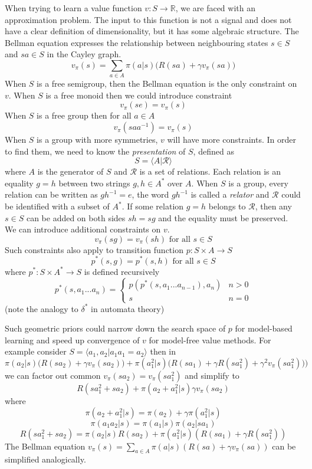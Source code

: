\documentclass[12pt]{article}
\begin{document}
When trying to learn a value function $v:S\rightarrow \mathbb{R}$, we are faced with an approximation problem. The input to this function is not a signal and does not have a clear definition of dimensionality, but it has some algebraic structure.  The Bellman equation expresses the relationship between neighbouring states $s\in S$ and $sa\in S$ in the Cayley graph.
\[
v_\pi(s) = \sum_{a\in A} \pi(a|s)\big(R(sa)+\gamma v_\pi(sa)\big)
\]
When $S$ is a free semigroup, then the Bellman equation is the only constraint on $v$. When $S$ is a free monoid then we could introduce constraint
\[
v_\pi(se) = v_\pi(s)
\]
When $S$ is a free group then for all $a\in A$ 
\[
v_\pi(saa^{-1}) = v_\pi(s)
\]
When $S$ is a group with more symmetries, $v$ will have more constraints. In order to find them, we need to know the \textit{presentation} of $S$, defined as
\[
S = \langle A \vert \mathcal{R} \rangle
\]
where $A$ is the generator of $S$ and $\mathcal{R}$ is a set of relations. Each relation is an equality $g=h$ between two strings $g,h\in A^*$ over $A$. When $S$ is a group, every relation can be written as $gh^{-1}=e$, the word $gh^{-1}$ is called a \textit{relator} and $\mathcal{R}$ could be identified with a subset of $A^*$.
If some relation $g=h$ belongs to $\mathcal{R}$, then any $s\in S$ can be added on both sides $sh=sg$ and the equality must be preserved.  We can introduce additional constraints on $v$.  
\[
v_\pi(sg) = v_\pi(sh) \text{ for all }s\in S 
\]
Such constraints also apply to transition function $p:S\times A \rightarrow S$ 
\[
p^*(s,g)= p^*(s,h) \text{ for all }s\in S 
\]
where $p^*:S\times A^* \rightarrow S$ is defined recursively
\begin{equation*}
p^*(s, a_1 ... a_n) = \begin{cases}
		p(p^*(s, a_1 ... a_{n-1}),a_n) & n>0\\
		s & n=0
	\end{cases}
\end{equation*}
(note the analogy to $\delta^*$ in automata theory)

Such geometric priors could narrow down the search space of $p$  for model-based learning and speed up convergence of $v$ for model-free value methods. For example consider $S=\langle a_1,a_2 | a_1a_1=a_2 \rangle$ then in
\[
\pi(a_2|s)\big(R(sa_2)+\gamma v_\pi(sa_2)\big)+\pi(a_1^2|s)\big(R(sa_1)+\gamma R(sa_1^2)+\gamma^2 v_\pi(sa_1^2))\big) 
\]
we can factor out common $v_\pi(sa_2)=v_\pi(sa_1^2)$ and simplify to
\[R(sa_1^2+sa_2) + \pi(a_2+a_1^2|s) \gamma v_\pi(sa_2) \]
where 
\[
\pi(a_2+a_1^2|s)=\pi(a_2)+\gamma \pi(a_1^2|s)
\]
\[
\pi(a_1a_2|s)=\pi(a_1|s)\pi(a_2|sa_1)
\]
\[
R(sa_1^2+sa_2)=\pi(a_2|s)R(sa_2)+\pi(a_1^2|s)(R(sa_1)+\gamma R(sa_1^2))
\]
The Bellman equation $v_\pi(s) = \sum_{a\in A} \pi(a|s)(R(sa)+\gamma v_\pi(sa))$ can be simplified analogically.
\end{document}
